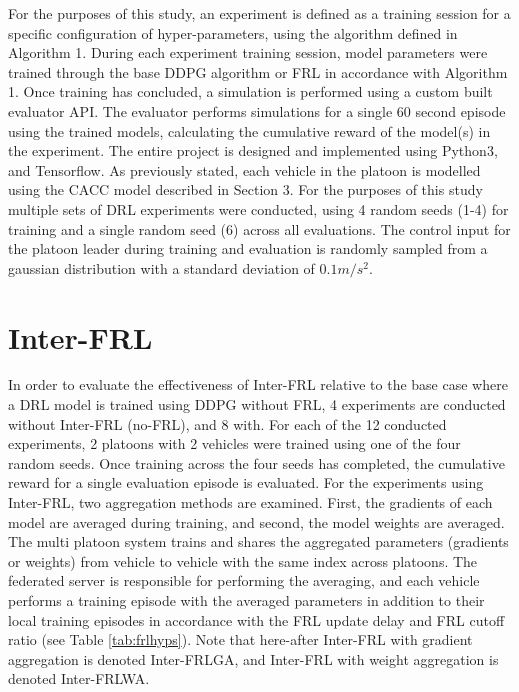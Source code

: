 For the purposes of this study, an experiment is defined as a training session for a
specific configuration of hyper-parameters, using the algorithm defined in Algorithm 1.
During each experiment training session, model parameters were trained through the base
DDPG algorithm or FRL in accordance with Algorithm 1. Once training has concluded, a
simulation is performed using a custom built evaluator API.  The evaluator performs
simulations for a single 60 second episode using the trained models, calculating the
cumulative reward of the model(s) in the experiment.  The entire project is designed and
implemented using Python3, and Tensorflow.  As previously stated, each vehicle in the
platoon is modelled using the CACC model described in Section 3.  For the purposes
of this study multiple sets of DRL experiments were conducted, using 4 random seeds (1-4)
for training and a single random seed (6) across all evaluations. The control input for the platoon
leader during training and evaluation is randomly sampled from a gaussian distribution
with a standard deviation of $0.1m/s^2$.

\section{Inter-FRL}
In order to evaluate the effectiveness of Inter-FRL relative to the base case where a
DRL model is trained using DDPG without FRL, 4 experiments are conducted without
Inter-FRL (no-FRL), and 8 with.  For each of the 12 conducted experiments, 2 platoons
with 2 vehicles were trained using one of the four random seeds.  Once training
across the four seeds has completed, the cumulative reward for a single evaluation
episode is evaluated.  For the experiments using Inter-FRL, two aggregation methods
are examined.  First, the gradients of each model are averaged during training, and
second, the model weights are averaged.  The multi platoon system trains and shares
the aggregated parameters (gradients or weights) from vehicle to vehicle with the same
index across platoons. The federated server is responsible for performing the averaging,
and each vehicle performs a training episode with the averaged parameters in addition
to their local training episodes in accordance with the FRL update delay and FRL
cutoff ratio (see Table \ref{tab:frlhyps}). Note that here-after Inter-FRL with gradient
aggregation is denoted Inter-FRLGA, and Inter-FRL with weight aggregation is denoted
Inter-FRLWA.


